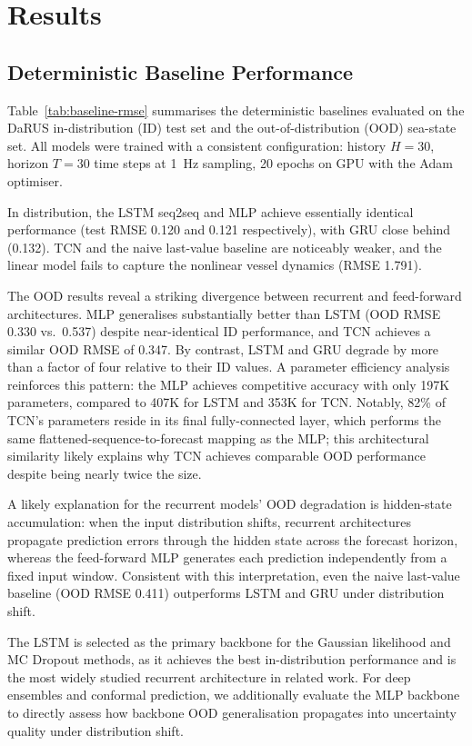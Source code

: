 \documentclass[a4paper,fleqn]{cas-sc}
\begin{document}
\section{Results}

\subsection{Deterministic Baseline Performance}

Table~\ref{tab:baseline-rmse} summarises the deterministic baselines evaluated on the DaRUS in-distribution (ID) test set and the out-of-distribution (OOD) sea-state set. All models were trained with a consistent configuration: history $H=30$, horizon $T=30$ time steps at 1~Hz sampling, 20 epochs on GPU with the Adam optimiser.

In distribution, the LSTM seq2seq and MLP achieve essentially identical performance (test RMSE 0.120 and 0.121 respectively), with GRU close behind (0.132). TCN and the naive last-value baseline are noticeably weaker, and the linear model fails to capture the nonlinear vessel dynamics (RMSE 1.791).

The OOD results reveal a striking divergence between recurrent and feed-forward architectures. MLP generalises substantially better than LSTM (OOD RMSE 0.330 vs.\ 0.537) despite near-identical ID performance, and TCN achieves a similar OOD RMSE of 0.347. By contrast, LSTM and GRU degrade by more than a factor of four relative to their ID values. A parameter efficiency analysis reinforces this pattern: the MLP achieves competitive accuracy with only 197K parameters, compared to 407K for LSTM and 353K for TCN. Notably, 82\% of TCN's parameters reside in its final fully-connected layer, which performs the same flattened-sequence-to-forecast mapping as the MLP; this architectural similarity likely explains why TCN achieves comparable OOD performance despite being nearly twice the size.

A likely explanation for the recurrent models' OOD degradation is hidden-state accumulation: when the input distribution shifts, recurrent architectures propagate prediction errors through the hidden state across the forecast horizon, whereas the feed-forward MLP generates each prediction independently from a fixed input window. Consistent with this interpretation, even the naive last-value baseline (OOD RMSE 0.411) outperforms LSTM and GRU under distribution shift.

The LSTM is selected as the primary backbone for the Gaussian likelihood and MC 
Dropout methods, as it achieves the best in-distribution performance and is the 
most widely studied recurrent architecture in related work. For deep ensembles and 
conformal prediction, we additionally evaluate the MLP backbone to directly assess 
how backbone OOD generalisation propagates into uncertainty quality under 
distribution shift.
\end{document}
